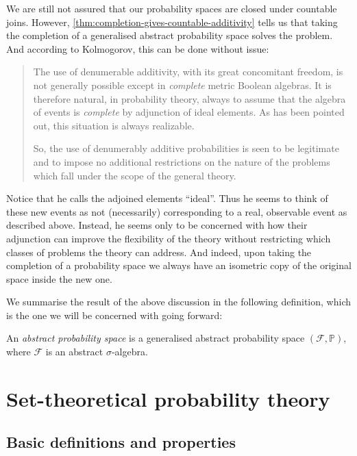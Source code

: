 \documentclass[article, a4paper, 11pt, oneside]{memoir}
\numberwithin{equation}{chapter}
\newcommand{\calF}{\mathcal{F}}
\renewcommand{\P}{\mathbb{P}}
\begin{document}
We are still not assured that our probability spaces are closed under countable joins. However, \cref{thm:completion-gives-countable-additivity} tells us that taking the completion of a generalised abstract probability space solves the problem. And according to Kolmogorov, this can be done without issue:
%
\newlength{\oldparindent}
\setlength{\oldparindent}{\parindent}
\blockquote[\cite{kolmogorov1995}]{\setlength{\parskip}{0pt}\setlength{\parindent}{\oldparindent}
    The use of denumerable additivity, with its great concomitant freedom, is not generally possible except in \emph{complete} metric Boolean algebras. It is therefore natural, in probability theory, always to assume that the algebra of events is \emph{complete} by adjunction of ideal elements. As has been pointed out, this situation is always realizable.

    So, the use of denumerably additive probabilities is seen to be legitimate and to impose no additional restrictions on the nature of the problems which fall under the scope of the general theory.
}
%
Notice that he calls the adjoined elements \enquote{ideal}. Thus he seems to think of these new events as not (necessarily) corresponding to a real, observable event as described above. Instead, he seems only to be concerned with how their adjunction can improve the flexibility of the theory without restricting which classes of problems the theory can address. And indeed, upon taking the completion of a probability space we always have an isometric copy of the original space inside the new one.

We summarise the result of the above discussion in the following definition, which is the one we will be concerned with going forward:

\begin{definition}
    \label{def:abstract-probability-space}
    An \emph{abstract probability space} is a generalised abstract probability space $(\calF, \P)$, where $\calF$ is an abstract $\sigma$-algebra.
\end{definition}


\chapter{Set-theoretical probability theory}

\section{Basic definitions and properties}
\end{document}
